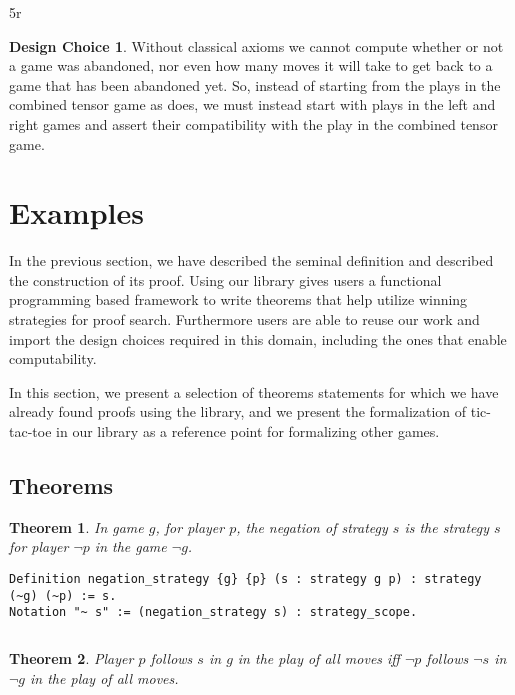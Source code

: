 5r\documentclass{article}
\newtheorem{thm}{Theorem}
\theoremstyle{definition}
\newtheorem*{designchoice}{Design Choice}
\begin{document}
\begin{designchoice}
Without classical axioms we cannot compute whether or not a game was abandoned, nor even how many moves it will take to get back to a game that has been abandoned yet. So, instead of starting from the plays in the combined tensor game as \textcite{Blass1992} does, we must instead start with plays in the left and right games and assert their compatibility with the play in the combined tensor game. 
\end{designchoice}



\section{Examples}

In the previous section, we have described the seminal definition and described the construction of its proof. Using our library gives users a functional programming based framework to write theorems that help utilize winning strategies for proof search. Furthermore users are able to reuse our work and import the design choices required in this domain, including the ones that enable computability. 

In this section, we present a selection of theorems statements for which we have already found proofs using the library, and we present the formalization of tic-tac-toe in our library as a reference point for formalizing other games. 

\subsection{Theorems}

\begin{thm}
In game $g$, for player $p$, the  negation of strategy $s$ is the strategy $s$ for player  $\neg p$ in the game $\neg g$.  
\end{thm}

\begin{verbatim}
Definition negation_strategy {g} {p} (s : strategy g p) : strategy (~g) (~p) := s.
Notation "~ s" := (negation_strategy s) : strategy_scope.
\end{verbatim}

$\left.\right.$

\begin{thm}
Player $p$ follows  $s$ in   $g$ in the play of all moves iff  $\neg p$ follows  $\neg s$ in  $\neg g$ in the play of all moves.
\end{thm}
\end{document}
